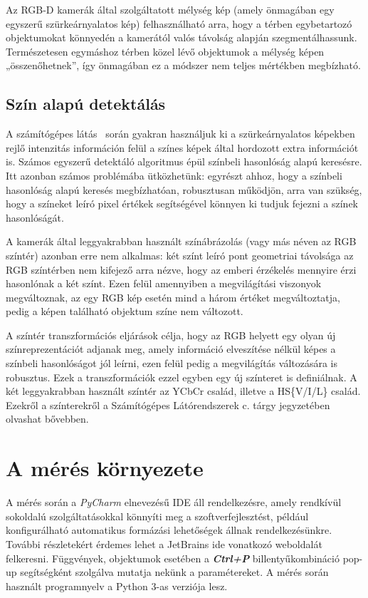 \documentclass[12pt,a4paper,oneside]{report}             %
\begin{document}
Az RGB-D kamerák által szolgáltatott mélység kép (amely önmagában egy egyszerű szürkeárnyalatos kép) felhasználható arra, hogy a térben egybetartozó objektumokat könnyedén a kamerától valós távolság alapján szegmentálhassunk. Természetesen egymáshoz térben közel lévő objektumok a mélység képen „összenőhetnek”, így önmagában ez a módszer nem teljes mértékben megbízható.

\section{Szín alapú detektálás}

A számítógépes látás~\cite{szgl} során gyakran használjuk ki a szürkeárnyalatos képekben rejlő intenzitás információn felül a színes képek által hordozott extra információt is. Számos egyszerű detektáló algoritmus épül színbeli hasonlóság alapú keresésre. Itt azonban számos problémába ütközhetünk: egyrészt ahhoz, hogy a színbeli hasonlóság alapú keresés megbízhatóan, robusztusan működjön, arra van szükség, hogy a színeket leíró pixel értékek segítségével könnyen ki tudjuk fejezni a színek hasonlóságát. 

A kamerák által leggyakrabban használt színábrázolás (vagy más néven az RGB színtér) azonban erre nem alkalmas: két színt leíró pont geometriai távolsága az RGB színtérben nem kifejező arra nézve, hogy az emberi érzékelés mennyire érzi hasonlónak a két színt. Ezen felül amennyiben a megvilágítási viszonyok megváltoznak, az egy RGB kép esetén mind a három értéket megváltoztatja, pedig a képen található objektum színe nem változott.

A színtér transzformációs eljárások célja, hogy az RGB helyett egy olyan új színreprezentációt adjanak meg, amely információ elveszítése nélkül képes a színbeli hasonlóságot jól leírni, ezen felül pedig a megvilágítás változására is robusztus. Ezek a transzformációk ezzel egyben egy új színteret is definiálnak. A két leggyakrabban használt színtér az YCbCr család, illetve a HS\{V/I/L\} család. Ezekről a színterekről a Számítógépes Látórendszerek c. tárgy jegyzetében~\cite{szgl} olvashat bővebben.

\chapter{A mérés környezete}

A mérés során a \emph{PyCharm} elnevezésű IDE áll rendelkezésre, amely rendkívül sokoldalú szolgáltatásokkal könnyíti meg a szoftverfejlesztést, például konfigurálható automatikus formázási lehetőségek állnak rendelkezésünkre. További részletekért érdemes lehet a JetBrains ide vonatkozó weboldalát~\cite{pycharm} felkeresni. Függvények, objektumok esetében a \textbf{\textit{Ctrl+P}} billentyűkombináció pop-up segítségként szolgálva mutatja nekünk a paramétereket. A mérés során használt programnyelv a Python 3-as verziója lesz.
\end{document}
